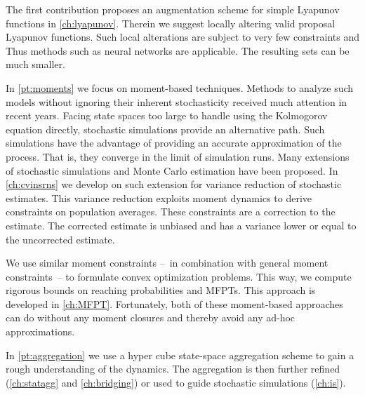 The first contribution proposes an augmentation scheme for simple Lyapunov functions in \autoref{ch:lyapunov}.
Therein we suggest locally altering valid proposal Lyapunov functions.
Such local alterations are subject to very few constraints and
Thus methods such as neural networks are applicable.
The resulting sets can be much smaller.

In \autoref{pt:moments} we focus on moment-based techniques.
Methods to analyze such models without ignoring their inherent stochasticity received much attention in recent years.
Facing state spaces too large to handle using the Kolmogorov equation directly, stochastic simulations \parencite{gillespie1977exact} provide an alternative path.
Such simulations have the advantage of providing an accurate approximation of the process.
That is, they converge in the limit of simulation runs.
Many extensions of stochastic simulations and Monte Carlo estimation have been proposed.
In \autoref{ch:cvinsrns} we develop on such extension for variance reduction of stochastic estimates.
This variance reduction exploits moment dynamics to derive constraints on population averages.
These constraints are a correction to the estimate.
The corrected estimate is unbiased and has a variance lower or equal to the uncorrected estimate.

We use similar moment constraints  --~in combination with general moment constraints~-- to formulate convex optimization problems.
This way, we compute rigorous bounds on reaching probabilities and \aclp{MFPT}.
This approach is developed in \autoref{ch:MFPT}.
Fortunately, both of these moment-based approaches can do without any moment closures
and thereby avoid any ad-hoc approximations.

In \autoref{pt:aggregation} we use a hyper cube state-space aggregation scheme to gain a rough understanding of the dynamics.
The aggregation is then further refined (\autoref{ch:statagg} and \autoref{ch:bridging}) or used to guide stochastic simulations (\autoref{ch:is}).

